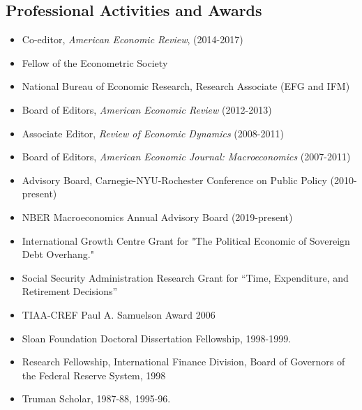 \documentclass[12pt]{article}
\begin{document}
\subsection*{Professional Activities and Awards}

\begin{itemize}[left=0pt .. \parindent, label=]
\item Co-editor, \textit{American Economic Review}, (2014-2017)

\item Fellow of the Econometric Society

\item National Bureau of Economic Research, Research Associate (EFG and IFM)

\item Board of Editors, \textit{American Economic Review} (2012-2013)

\item Associate Editor, \textit{Review of Economic Dynamics} (2008-2011)

\item Board of Editors, \textit{American Economic Journal: Macroeconomics}
(2007-2011)

\item Advisory Board, Carnegie-NYU-Rochester Conference on Public Policy
(2010-present)

\item NBER Macroeconomics Annual Advisory Board (2019-present)

\item International Growth Centre Grant for "The Political Economic of
Sovereign Debt Overhang."

\item Social Security Administration Research Grant for ``Time, Expenditure,
and Retirement Decisions''

\item TIAA-CREF Paul A. Samuelson Award 2006

\item Sloan Foundation Doctoral Dissertation Fellowship, 1998-1999.

\item Research Fellowship, International Finance Division, Board of Governors of the Federal Reserve System, 1998

\item Truman Scholar, 1987-88, 1995-96.

\end{itemize}
 
   
\end{document}
